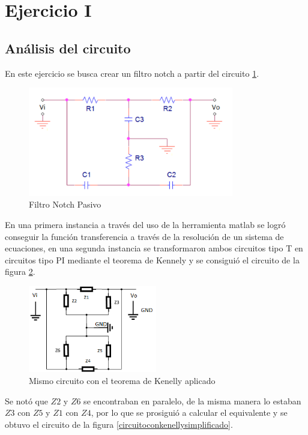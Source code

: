 \documentclass[12pt,a4paper]{article}
\begin{document}
\section{Ejercicio I}
\subsection{Análisis del circuito}
En este ejercicio se busca crear un filtro notch a partir del circuito \ref{fig:circuito_1}. 

\begin{figure}[H]                                                       
    \centering
    	\includegraphics[width=0.8\textwidth]{circuito_1.png}
    	\caption{Filtro Notch Pasivo}
    	\label{fig:circuito_1}
\end{figure}

En una primera instancia a través del uso de la herramienta matlab se logró conseguir la función transferencia a través de la resolución de un sistema de ecuaciones, en una segunda instancia se transformaron ambos circuitos tipo T en circuitos tipo PI mediante el teorema de Kennely y se consiguió el circuito de la figura \ref{circuitoconkenelly}.

\begin{figure}[H]                                                       
    \centering\includegraphics[width=0.5\textwidth]{circuitoconkenelly.png}
    \caption{Mismo circuito con el teorema de Kenelly aplicado}
    \label{circuitoconkenelly}
\end{figure}
Se notó que $Z2$ y $Z6$ se encontraban en paralelo, de la misma manera lo estaban $Z3$ con $Z5$ y $Z1$ con $Z4$, por lo que se prosiguió a calcular el equivalente y se obtuvo el circuito de la figura \ref{circuitoconkenellysimplificado}.
\end{document}

